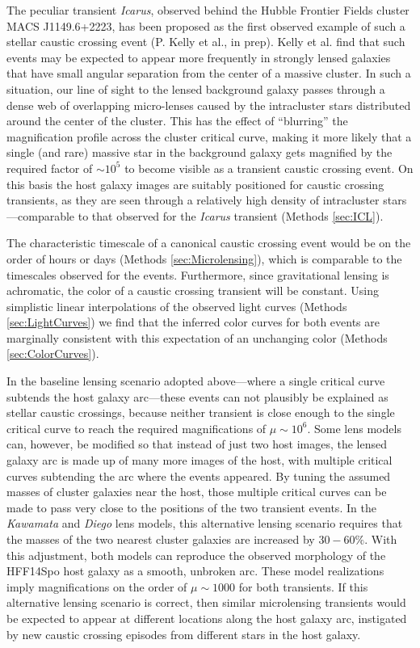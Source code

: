 The peculiar transient {\it Icarus}, observed behind the Hubble
Frontier Fields cluster MACS J1149.6+2223, has been proposed as the
first observed example of such a stellar caustic crossing event
(P. Kelly et al., in prep). Kelly et al. find that such events may be
expected to appear more frequently in strongly lensed galaxies that
have small angular separation from the center of a massive cluster. In
such a situation, our line of sight to the lensed background galaxy
passes through a dense web of overlapping micro-lenses caused by the
intracluster stars distributed around the center of the cluster. This
has the effect of ``blurring'' the magnification profile across the
cluster critical curve, making it more likely that a single (and rare)
massive star in the background galaxy gets magnified by the required
factor of $\sim10^5$ to become visible as a transient caustic crossing
event.  On this basis the \spock host galaxy images are suitably
positioned for caustic crossing transients, as they are seen through a
relatively high density of intracluster stars---comparable to that
observed for the {\it Icarus} transient (Methods \ref{sec:ICL}).

The characteristic timescale of a canonical caustic crossing event
would be on the order of hours or days (Methods
\ref{sec:Microlensing}), which is comparable to the timescales
observed for the \spock events. Furthermore, since gravitational
lensing is achromatic, the color of a caustic crossing transient will
be constant.  Using simplistic linear interpolations of the observed
light curves (Methods \ref{sec:LightCurves}) we find that the inferred
color curves for both \spock events are marginally consistent with
this expectation of an unchanging color (Methods
\ref{sec:ColorCurves}).

In the baseline lensing scenario adopted above---where a single
critical curve subtends the \spock host galaxy arc---these events can
not plausibly be explained as stellar caustic crossings, because
neither transient is close enough to the single critical curve to
reach the required magnifications of $\mu\sim10^6$.  Some lens models
can, however, be modified so that instead of just two host images, the
lensed galaxy arc is made up of many more images of the host, with
multiple critical curves subtending the arc where the \spock events
appeared.  By tuning the assumed masses of cluster galaxies near the
\spock host, those multiple critical curves can be made to pass very
close to the positions of the two \spock transient events.  In the
{\it Kawamata} and {\it Diego} lens models, this alternative lensing
scenario requires that the masses of the two nearest cluster galaxies
are increased by $30-60\%$.  With this adjustment, both models can
reproduce the observed morphology of the HFF14Spo host galaxy as a
smooth, unbroken arc.  These model realizations imply magnifications
on the order of $\mu\sim1000$ for both \spock transients. If this
alternative lensing scenario is correct, then similar microlensing
transients would be expected to appear at different locations along
the host galaxy arc, instigated by new caustic crossing episodes from
different stars in the host galaxy.
